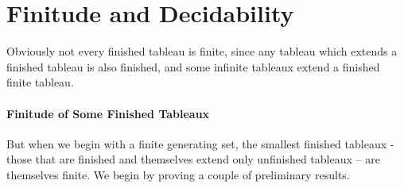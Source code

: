 \section{Finitude and Decidability}

Obviously not every finished tableau is finite, since any tableau which extends a finished tableau is also finished, and some infinite tableaux extend a finished finite tableau. 

\paragraph{Finitude of Some Finished Tableaux}  But when we begin with a finite generating set, the smallest finished tableaux - those that are finished and themselves extend only unfinished tableaux – are themselves finite. We begin by proving a couple of preliminary results.

